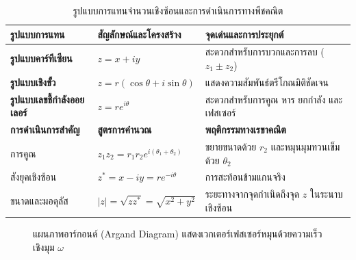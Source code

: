 \begin{table}[htbp]
    \centering
    \caption{รูปแบบการแทนจำนวนเชิงซ้อนและการดำเนินการทางพีชคณิต}
    \label{tab:complex_representations}
    \begin{tabularx}{\textwidth}{p{3.2cm}p{4.5cm}Y}
        \toprule
        \textbf{รูปแบบการแทน} & \textbf{สัญลักษณ์และโครงสร้าง} & \textbf{จุดเด่นและการประยุกต์} \\
        \midrule
        \textbf{รูปแบบคาร์ทีเซียน} & $z = x + iy$ & สะดวกสำหรับการบวกและการลบ ($z_1 \pm z_2$) \\
        \textbf{รูปแบบเชิงขั้ว} & $z = r(\cos\theta + i\sin\theta)$ & แสดงความสัมพันธ์ตรีโกณมิติชัดเจน \\
        \textbf{รูปแบบเลขชี้กำลังออยเลอร์} & $z = r e^{i\theta}$ & สะดวกสำหรับการคูณ หาร ยกกำลัง และเฟสเซอร์ \\
        \midrule
        \textbf{การดำเนินการสำคัญ} & \textbf{สูตรการคำนวณ} & \textbf{พฤติกรรมทางเรขาคณิต} \\
        \midrule
        การคูณ & $z_1 z_2 = r_1 r_2 e^{i(\theta_1 + \theta_2)}$ & ขยายขนาดด้วย $r_2$ และหมุนมุมทวนเข็มด้วย $\theta_2$ \\
        สังยุคเชิงซ้อน & $z^* = x - iy = r e^{-i\theta}$ & การสะท้อนข้ามแกนจริง \\
        ขนาดและมอดุลัส & $|z| = \sqrt{z z^*} = \sqrt{x^2 + y^2}$ & ระยะทางจากจุดกำเนิดถึงจุด $z$ ในระนาบเชิงซ้อน \\
        \bottomrule
    \end{tabularx}
\end{table}

\begin{figure}[htbp]
    \centering
    \caption{แผนภาพอาร์กอนด์ (Argand Diagram) แสดงเวกเตอร์เฟสเซอร์หมุนด้วยความเร็วเชิงมุม $\omega$}
    \label{fig:argand_phasor}
\end{figure}

